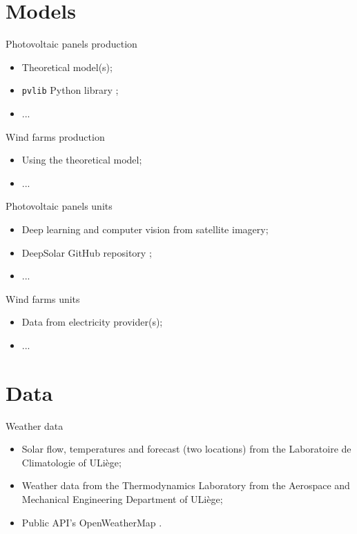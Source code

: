 \documentclass[12pt]{beamer}
\begin{document}
\section{Models}

\begin{frame}{Photovoltaic panels production}
    \begin{itemize}
        \item Theoretical model(s);
        \item \texttt{pvlib} Python library \cite{pvlib};
        \item ...
    \end{itemize}
\end{frame}

\begin{frame}{Wind farms production}
    \begin{itemize}
        \item Using the theoretical model;
        \item ...
    \end{itemize}
\end{frame}

\begin{frame}{Photovoltaic panels units}
    \begin{itemize}
        \item Deep learning and computer vision from satellite imagery;
        \item \alert{DeepSolar} GitHub repository \cite{deepsolar};
        \item ...
    \end{itemize}
\end{frame}

\begin{frame}{Wind farms units}
    \begin{itemize}
        \item Data from electricity provider(s);
        \item ...
    \end{itemize}
\end{frame}

\section{Data}

\begin{frame}{Weather data}
    \begin{itemize}
        \item Solar flow, temperatures and forecast (two locations) from the \alert{Laboratoire de Climatologie} of ULiège;
        \item Weather data from the \alert{Thermodynamics Laboratory} from the Aerospace and Mechanical Engineering Department of ULiège;
        \item Public API’s \alert{OpenWeatherMap} \cite{openweathermap}.
    \end{itemize}
\end{frame}
\end{document}
